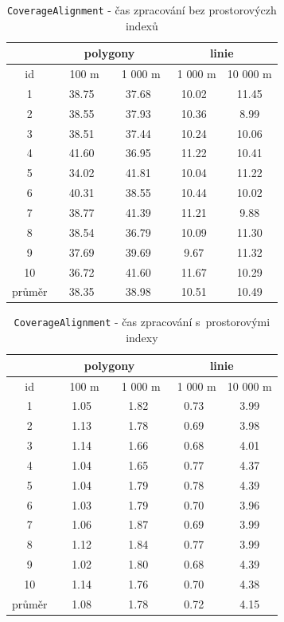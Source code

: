 \begin{table}
 \centering
  \small
   \caption{\texttt{Coverage\-Alignment} - 
	    čas zpracování bez prostorovýczh indexů}
  \begin{tabular}{|c|c|c|c|c|}
   \hline
      & \multicolumn{2}{c|}{polygony} & 
 	\multicolumn{2}{c|}{linie} \\
   \hline
    id  &  ~~100 m~ & ~1 000 m & ~1 000 m & 10 000 m\\
   \hline
   \hline
 1  & 38.75 & 37.68 & 10.02 & 11.45 \\ 
 2  & 38.55 & 37.93 & 10.36 & 8.99  \\
 3  & 38.51 & 37.44 & 10.24 & 10.06 \\
 4  & 41.60 & 36.95 & 11.22 & 10.41 \\
 5  & 34.02 & 41.81 & 10.04 & 11.22 \\
 6  & 40.31 & 38.55 & 10.44 & 10.02 \\
 7  & 38.77 & 41.39 & 11.21 & 9.88 \\
 8  & 38.54 & 36.79 & 10.09 & 11.30 \\
 9  & 37.69 & 39.69 & 9.67  & 11.32 \\
 10 & 36.72 & 41.60 & 11.67 & 10.29 \\
   \hline
   \hline
   průměr & 38.35 & 38.98 & 10.51 & 10.49 \\
   \hline
  \end{tabular}
   \label{tab:ca-bez}
\end{table}
 
\begin{table}
 \centering
  \small
   \caption{\texttt{Coverage\-Alignment} - 
	    čas zpracování s~prostorovými indexy}
  \begin{tabular}{|c|c|c|c|c|}
   \hline
      & \multicolumn{2}{c|}{polygony} & 
 	\multicolumn{2}{c|}{linie} \\
   \hline
    id  &  ~~100 m~ & ~1 000 m & ~1 000 m & 10 000 m\\
   \hline
   \hline
 1  & 1.05 & 1.82 &  0.73 & 3.99 \\
 2  & 1.13 & 1.78 &  0.69 & 3.98 \\
 3  & 1.14 & 1.66 &  0.68 & 4.01 \\
 4  & 1.04 & 1.65 &  0.77 & 4.37 \\
 5  & 1.04 & 1.79 &  0.78 & 4.39 \\
 6  & 1.03 & 1.79 &  0.70 & 3.96 \\
 7  & 1.06 & 1.87 &  0.69 & 3.99 \\
 8  & 1.12 & 1.84 &  0.77 & 3.99 \\
 9  & 1.02 & 1.80 &  0.68 & 4.39 \\
 10 & 1.14 & 1.76 &  0.70 & 4.38 \\
   \hline
   \hline
   průměr & 1.08 & 1.78 & 0.72 & 4.15 \\
   \hline
  \end{tabular}
   \label{tab:ca-s}
\end{table}
 
